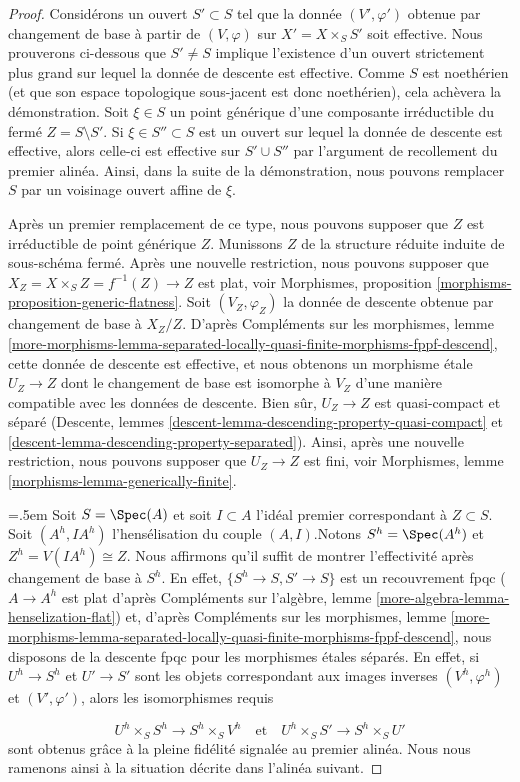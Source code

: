 \begin{proof}
\medskip\noindent
Considérons un ouvert $S' \subset S$ tel que la donnée $(V', \varphi')$ obtenue
par changement de base à partir de $(V, \varphi)$ sur $X' = X \times_S S'$ soit effective. Nous prouverons ci-dessous
que $S' \not = S$ implique l'existence d'un ouvert strictement plus grand sur
lequel la donnée de descente est effective. Comme $S$ est noethérien (et que son
espace topologique sous-jacent est donc noethérien), cela achèvera la démonstration.
Soit $\xi \in S$ un point générique d'une composante irréductible du
fermé $Z = S \setminus S'$.
Si $\xi \in S'' \subset S$ est un ouvert sur lequel la donnée de descente est
effective, alors celle-ci est effective sur
$S' \cup S''$ par l'argument de recollement du premier alinéa. Ainsi,
dans la suite de la démonstration, nous pouvons remplacer $S$ par un voisinage ouvert affine
de $\xi$.

\medskip\noindent
Après un premier remplacement de ce type, nous pouvons supposer que $Z$ est irréductible
de point générique $Z$. Munissons $Z$ de la structure réduite induite
de sous-schéma fermé. Après une nouvelle restriction, nous pouvons supposer que
$X_Z = X \times_S Z = f^{-1}(Z) \to Z$ est plat, voir
Morphismes, proposition \ref{morphisms-proposition-generic-flatness}.
Soit $(V_Z, \varphi_Z)$ la donnée de descente obtenue par changement de base à $X_Z/Z$.
D'après Compléments sur les morphismes, lemme
\ref{more-morphisms-lemma-separated-locally-quasi-finite-morphisms-fppf-descend},
cette donnée de descente est effective, et nous obtenons un morphisme \'etale
$U_Z \to Z$ dont le changement de base est isomorphe à $V_Z$ d'une manière
compatible avec les données de descente.
Bien sûr, $U_Z \to Z$ est quasi-compact et séparé
(Descente, lemmes \ref{descent-lemma-descending-property-quasi-compact} et
\ref{descent-lemma-descending-property-separated}).
Ainsi, après une nouvelle restriction, nous pouvons supposer
que $U_Z \to Z$ est fini, voir
Morphismes, lemme \ref{morphisms-lemma-generically-finite}.

{\emergencystretch=.5em\medskip\noindent
Soit $S = \Spec(A)$ et soit $I \subset A$ l'idéal premier correspondant
à $Z \subset S$. Soit $(A^h, IA^h)$ l'hensélisation du couple
$(A, I)$.\linebreak Notons $S^h = \Spec(A^h)$ et $Z^h = V(IA^h) \cong Z$.
Nous affirmons qu'il suffit de montrer l'effectivité après changement de base à
$S^h$. En effet, $\{S^h \to S, S' \to S\}$ est un recouvrement fpqc
($A \to A^h$ est plat d'après Compléments sur l'algèbre, lemme
\ref{more-algebra-lemma-henselization-flat}) et,
d'après Compléments sur les morphismes, lemme
\ref{more-morphisms-lemma-separated-locally-quasi-finite-morphisms-fppf-descend},
nous disposons de la descente fpqc pour les morphismes \'etales séparés.
En effet, si $U^h \to S^h$ et $U' \to S'$ sont les objets
correspondant aux images inverses $(V^h, \varphi^h)$ et
$(V', \varphi')$, alors les isomorphismes requis\par}
$$
U^h \times_S S^h \to S^h \times_S V^h
\quad\text{et}\quad
U^h \times_S S' \to S^h \times_S U'
$$
sont obtenus grâce à la pleine fidélité signalée au premier
alinéa. Nous nous ramenons ainsi à la situation décrite dans
l'alinéa suivant.


\end{proof}
